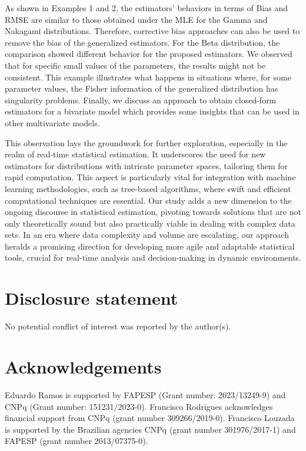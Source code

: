 \documentclass[10pt,a4paper,onecolumn]{article} %
\begin{document}
As shown in Examples 1 and 2, the estimators' behaviors in terms of Bias and RMSE are similar to those obtained under the MLE for the Gamma and Nakagami distributions. Therefore, corrective bias approaches can also be used to remove the bias of the generalized estimators. For the Beta distribution, the comparison showed different behavior for the proposed estimators. We observed that for specific small values of the parameters, the results might not be consistent. This example illustrates what happens in situations where, for some parameter values, the Fisher information of the generalized distribution has singularity problems. Finally, we discuss an approach to obtain closed-form estimators for a bivariate model which provides some insights that can be used in other multivariate models.



This observation lays the groundwork for further exploration, especially in the realm of real-time statistical estimation. It underscores the need for new estimators for distributions with intricate parameter spaces, tailoring them for rapid computation. This aspect is particularly vital for integration with machine learning methodologies, such as tree-based algorithms, where swift and efficient computational techniques are essential. Our study adds a new dimension to the ongoing discourse in statistical estimation, pivoting towards solutions that are not only theoretically sound but also practically viable in dealing with complex data sets. In an era where data complexity and volume are escalating, our approach heralds a promising direction for developing more agile and adaptable statistical tools, crucial for real-time analysis and decision-making in dynamic environments.


\section*{Disclosure statement}

No potential conflict of interest was reported by the author(s).

\section*{Acknowledgements}

  Eduardo Ramos is supported by FAPESP
(Grant number: 2023/13249-9) and CNPq (Grant number:  151231/2023-0). Francisco Rodrigues acknowledges financial support from CNPq (grant number 309266/2019-0). Francisco Louzada is supported by the Brazilian agencies CNPq (grant number
301976/2017-1) and FAPESP (grant number 2013/07375-0).
\end{document}
